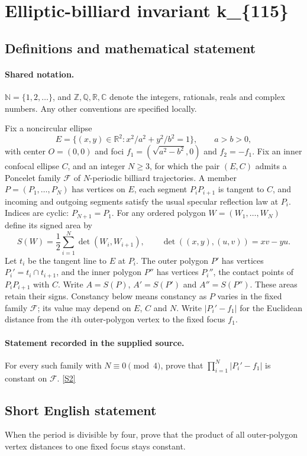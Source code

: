 \documentclass[11pt]{article}
\newcommand{\sref}[2]{\hyperlink{source:#1:#2}{[S#2]}}
\begin{document}
\section{Elliptic-billiard invariant k\_\{115\}}\label{statement}

\subsection{Definitions and mathematical statement}

\paragraph{Shared notation.}$\mathbb N=\{1,2,\ldots\}$, and $\mathbb Z,\mathbb Q,\mathbb R,\mathbb C$ denote the integers, rationals, reals and complex numbers. Any other conventions are specified locally.


Fix a noncircular ellipse
\[
E=\{(x,y)\in\mathbb R^2:x^2/a^2+y^2/b^2=1\},\qquad a>b>0,
\]
with center $O=(0,0)$ and foci $f_1=(\sqrt{a^2-b^2},0)$ and $f_2=-f_1$. Fix an inner confocal ellipse $C$, and an integer $N\geq3$, for which the pair $(E,C)$ admits a Poncelet family $\mathcal F$ of $N$-periodic billiard trajectories. A member $P=(P_1,\ldots,P_N)$ has vertices on $E$, each segment $P_iP_{i+1}$ is tangent to $C$, and incoming and outgoing segments satisfy the usual specular reflection law at $P_i$. Indices are cyclic: $P_{N+1}=P_1$.
For any ordered polygon $W=(W_1,\ldots,W_N)$ define its signed area by
\[
S(W)=\frac12\sum_{i=1}^N\det(W_i,W_{i+1}),\qquad
\det((x,y),(u,v))=xv-yu.
\]
Let $t_i$ be the tangent line to $E$ at $P_i$. The outer polygon $P'$ has vertices $P_i'=t_i\cap t_{i+1}$, and the inner polygon $P''$ has vertices $P_i''$, the contact points of $P_iP_{i+1}$ with $C$. Write $A=S(P)$, $A'=S(P')$ and $A''=S(P'')$. These areas retain their signs. Constancy below means constancy as $P$ varies in the fixed family $\mathcal F$; its value may depend on $E$, $C$ and $N$.
Write $|P_i'-f_1|$ for the Euclidean distance from the $i$th outer-polygon vertex to the fixed focus $f_1$.
\paragraph{Statement recorded in the supplied source.}
For every such family with $N\equiv0\pmod4$, prove that $\displaystyle\prod_{i=1}^N|P_i'-f_1|$ is constant on $\mathcal F$. \sref{statement}{2}
\subsection{Short English statement}
When the period is divisible by four, prove that the product of all outer-polygon vertex distances to one fixed focus stays constant.
\end{document}
